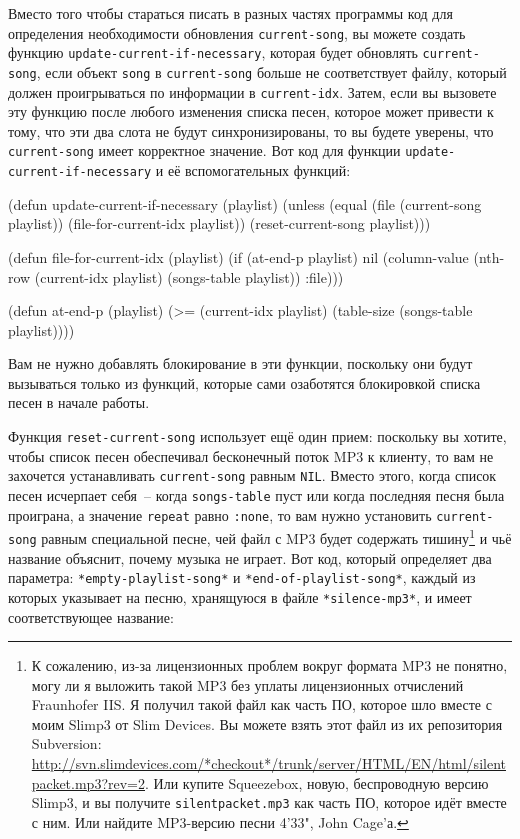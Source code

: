Вместо того чтобы стараться писать в разных частях программы код для определения
необходимости обновления \lstinline{current-song}, вы можете создать функцию
\lstinline{update-current-if-necessary}, которая будет обновлять \lstinline{current-song}, если
объект \lstinline{song} в \lstinline{current-song} больше не соответствует файлу, который должен
проигрываться по информации в \lstinline{current-idx}. Затем, если вы вызовете эту функцию
после любого изменения списка песен, которое может привести к тому, что эти два слота не
будут синхронизированы, то вы будете уверены, что \lstinline{current-song} имеет корректное
значение.  Вот код для функции \lstinline{update-current-if-necessary} и её вспомогательных
функций:

\begin{myverb}
(defun update-current-if-necessary (playlist)
  (unless (equal (file (current-song playlist))
                 (file-for-current-idx playlist))
    (reset-current-song playlist)))

(defun file-for-current-idx (playlist)
  (if (at-end-p playlist)
    nil
    (column-value (nth-row (current-idx playlist) (songs-table playlist)) :file)))

(defun at-end-p (playlist)
  (>= (current-idx playlist) (table-size (songs-table playlist))))
\end{myverb}

Вам не нужно добавлять блокирование в эти функции, поскольку они будут вызываться только
из функций, которые сами озаботятся блокировкой списка песен в начале работы.

Функция \lstinline{reset-current-song} использует ещё один прием: поскольку вы хотите, чтобы
список песен обеспечивал бесконечный поток MP3 к клиенту, то вам не захочется
устанавливать \lstinline{current-song} равным \lstinline{NIL}. Вместо этого, когда список песен
исчерпает себя~-- когда \lstinline{songs-table} пуст или когда последняя песня была
проиграна, а значение \lstinline{repeat} равно \lstinline{:none}, то вам нужно установить
\lstinline{current-song} равным специальной песне, чей файл с MP3 будет содержать
тишину\footnote{К сожалению, из-за лицензионных проблем вокруг формата MP3 не понятно,
  могу ли я выложить такой MP3 без уплаты лицензионных отчислений Fraunhofer IIS.  Я
  получил такой файл как часть ПО, которое шло вместе с моим Slimp3 от Slim Devices. Вы
  можете взять этот файл из их репозитория Subversion:
  \url{http://svn.slimdevices.com/*checkout*/trunk/server/HTML/EN/html/silentpacket.mp3?rev=2}.
  Или купите Squeezebox, новую, беспроводную версию Slimp3, и вы получите
  \lstinline{silentpacket.mp3} как часть ПО, которое идёт вместе с ним. Или найдите MP3-версию
  песни 4'33", John Cage'а.}\hspace{\footnotenegspace} и чьё название объяснит, почему музыка не играет.  Вот код,
который определяет два параметра: \lstinline{*empty-playlist-song*} и
\lstinline{*end-of-playlist-song*}, каждый из которых указывает на песню, хранящуюся в файле
\lstinline{*silence-mp3*}, и имеет соответствующее название:

